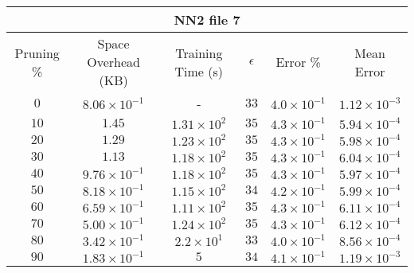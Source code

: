 \begin{adjustwidth}{0cm}{}
\begin{tabular}{cccccc}
\hline
\multicolumn{6}{c}{NN2 file 7} \\
\toprule
Pruning \% & Space Overhead (KB) & Training Time (s) & $\epsilon$ & Error \% & Mean Error\\
\midrule
$0$ & $8.06 \times 10^{-1}$ & - & $33$ & $4.0 \times 10^{-1}$ & $1.12 \times 10^{-3}$\\
$10$ & $1.45$ & $1.31 \times 10^{2}$ & $35$ & $4.3 \times 10^{-1}$ & $5.94 \times 10^{-4}$\\
$20$ & $1.29$ & $1.23 \times 10^{2}$ & $35$ & $4.3 \times 10^{-1}$ & $5.98 \times 10^{-4}$\\
$30$ & $1.13$ & $1.18 \times 10^{2}$ & $35$ & $4.3 \times 10^{-1}$ & $6.04 \times 10^{-4}$\\
$40$ & $9.76 \times 10^{-1}$ & $1.18 \times 10^{2}$ & $35$ & $4.3 \times 10^{-1}$ & $5.97 \times 10^{-4}$\\
$50$ & $8.18 \times 10^{-1}$ & $1.15 \times 10^{2}$ & $34$ & $4.2 \times 10^{-1}$ & $5.99 \times 10^{-4}$\\
$60$ & $6.59 \times 10^{-1}$ & $1.11 \times 10^{2}$ & $35$ & $4.3 \times 10^{-1}$ & $6.11 \times 10^{-4}$\\
$70$ & $5.00 \times 10^{-1}$ & $1.24 \times 10^{2}$ & $35$ & $4.3 \times 10^{-1}$ & $6.12 \times 10^{-4}$\\
$80$ & $3.42 \times 10^{-1}$ & $2.2 \times 10^{1}$ & $33$ & $4.0 \times 10^{-1}$ & $8.56 \times 10^{-4}$\\
$90$ & $1.83 \times 10^{-1}$ & $5$ & $34$ & $4.1 \times 10^{-1}$ & $1.19 \times 10^{-3}$\\
\bottomrule
\end{tabular}
\end{adjustwidth}

\par\null\par
\par\null\par

